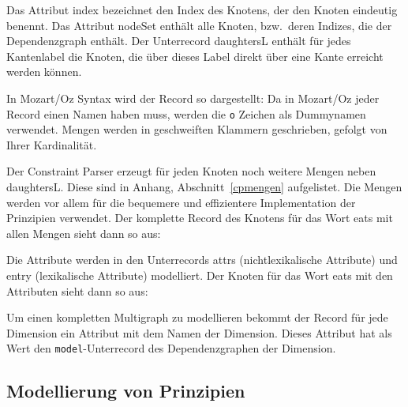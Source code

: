 
Das Attribut index bezeichnet den Index des Knotens, der den Knoten
eindeutig benennt. Das Attribut nodeSet enth\"alt alle Knoten,
bzw.\ deren Indizes, die der Dependenzgraph enth\"alt. Der Unterrecord
daughtersL enth\"alt f\"ur jedes Kantenlabel die Knoten, die \"uber
dieses Label direkt \"uber eine Kante erreicht werden k\"onnen.

In Mozart/Oz Syntax wird der Record so dargestellt:
Da in Mozart/Oz jeder Record
einen Namen haben muss, werden die {\tt o} Zeichen als Dummynamen
verwendet. Mengen werden in geschweiften Klammern geschrieben, gefolgt
von Ihrer Kardinalit\"at.

Der Constraint Parser erzeugt f\"ur jeden Knoten noch weitere Mengen
neben daughtersL. Diese sind in Anhang, Abschnitt~\ref{cpmengen}
aufgelistet. Die Mengen werden vor allem f\"ur die bequemere und
effizientere Implementation der Prinzipien verwendet.  Der komplette
Record des Knotens f\"ur das Wort eats mit allen Mengen sieht dann so
aus:


Die Attribute werden in den Unterrecords attrs (nichtlexikalische Attribute) und entry (lexikalische Attribute) modelliert. Der Knoten f\"ur das Wort eats mit den Attributen sieht dann so aus:


Um einen kompletten Multigraph zu modellieren bekommt der Record f\"ur
jede Dimension ein Attribut mit dem Namen der Dimension. Dieses
Attribut hat als Wert den {\tt model}-Unterrecord des Dependenzgraphen
der Dimension.

\subsection{Modellierung von Prinzipien}

